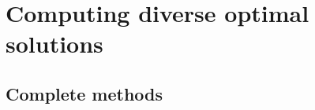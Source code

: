
\section{Computing diverse optimal solutions}\label{sec:approach}
\subsection{Complete methods}
\label{sec:complete:methods}



